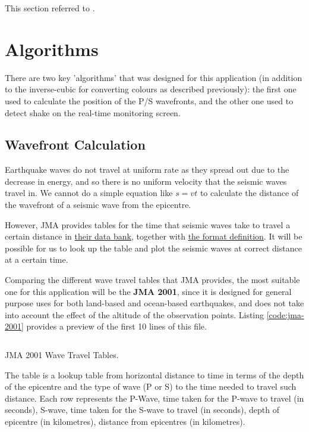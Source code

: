 This section referred to \autocite{dmdata-references-api, dmdata-references-json, dmdata-references-oauth, dmdata-references-telegram}.

\section{Algorithms}

There are two key 'algorithms' that was designed for this application (in addition to the inverse-cubic for converting colours as described previously): the first one used to calculate the position of the P/S wavefronts, and the other one used to detect shake on the real-time monitoring screen.

\subsection{Wavefront Calculation}

Earthquake waves do not travel at uniform rate as they spread out due to the decrease in energy, and so there is no uniform velocity that the seismic waves travel in. We cannot do a simple equation like \(s = vt\) to calculate the distance of the wavefront of a seismic wave from the epicentre.

However, JMA provides tables for the time that seismic waves take to travel a certain distance in \href{https://www.data.jma.go.jp/svd/eqev/data/bulletin/catalog/appendix/trtime/trt_j.html}{their data bank}, together with \href{https://www.data.jma.go.jp/svd/eqev/data/bulletin/catalog/appendix/trtime/trt_j.html}{the format definition}. It will be possible for us to look up the table and plot the seismic waves at correct distance at a certain time.

Comparing the different wave travel tables that JMA provides, the most suitable one for this application will be the \textbf{JMA 2001}, since it is designed for general purpose uses for both land-based and ocean-based earthquakes, and does not take into account the effect of the altitude of the observation points. Listing \ref{code:jma-2001} provides a preview of the first 10 lines of this file.

\begin{listing}[htp]
    \inputminted[lastline=10,showspaces]{text}{code/tjma2001.txt}
    \caption{JMA 2001 Wave Travel Tables.}
    \label{code:jma-2001}
\end{listing}

The table is a lookup table from horizontal distance to time in terms of the depth of the epicentre and the type of wave (P or S) to the time needed to travel such distance. Each row represents the P-Wave, time taken for the P-wave to travel (in seconds), S-wave, time taken for the S-wave to travel (in seconds), depth of epicentre (in kilometres), distance from epicentres (in kilometres).

